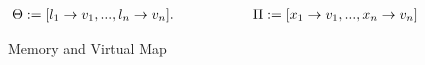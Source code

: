 \begin{figure}[H]
		\small
		\begin{minipage}[t]{.55\columnwidth}
			\[\begin{array}{@{}r@{\ \ }l@{\quad}l}
				\kheap := [l_1 \rightarrow v_1, ..., l_n \rightarrow v_n]. 
				\hspace{2cm} \kvm := [x_1 \rightarrow v_1, ..., x_n \rightarrow v_n]				
			\end{array}\]
		\end{minipage}%
		
	\caption{Memory and Virtual Map}\label{fig:memory-model}
\end{figure}



